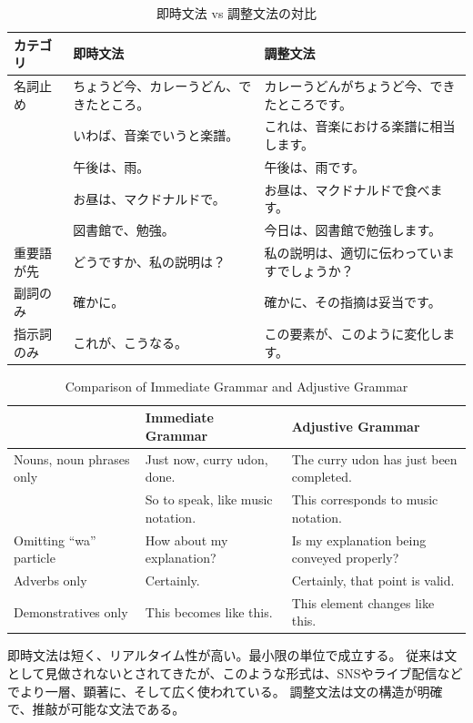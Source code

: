 \documentclass[a4paper]{article}
\begin{document}
\ifJPN
  \begin{table}[htb]\centering\small
  \caption{即時文法 vs 調整文法の対比}
  \label{tab:immediate-vs-adjustive-j}
  \begin{tabular}[c]{@{}lll@{}}
  \toprule
  カテゴリ   & 即時文法  & 調整文法\\ 
  \midrule
  名詞止め   & ちょうど今、カレーうどん、できたところ。&カレーうどんがちょうど今、できたところです。\\
             & いわば、音楽でいうと楽譜。& これは、音楽における楽譜に相当します。\\
             & 午後は、雨。& 午後は、雨です。\\
             & お昼は、マクドナルドで。& お昼は、マクドナルドで食べます。\\
             & 図書館で、勉強。& 今日は、図書館で勉強します。\\
  重要語が先 & どうですか、私の説明は？& 私の説明は、適切に伝わっていますでしょうか？\\
  副詞のみ& 確かに。&確かに、その指摘は妥当です。\\
  指示詞のみ& これが、こうなる。&	この要素が、このように変化します。\\
  \end{tabular}
\end{table}
\else
\begin{table}[htb]\centering\small
  \caption{Comparison of Immediate Grammar and Adjustive Grammar}
  \label{tab:immediate-vs-adjustive}
  \begin{tabular}[c]{@{}lll@{}}
  \toprule
    & Immediate Grammar & Adjustive Grammar \\ 
    \midrule
    Nouns, noun phrases only&
    Just now, curry udon, done.	&The curry udon has just been completed.\\
                                &
    So to speak, like music notation.	&This corresponds to music notation.\\
    Omitting ``wa'' particle&
    How about my explanation?	&Is my explanation being conveyed properly?\\
    Adverbs only&
    Certainly.	&Certainly, that point is valid.\\
    Demonstratives only&
    This becomes like this.	&This element changes like this.\\
  \end{tabular}
\end{table}
\fi

\ifJPN
即時文法は短く、リアルタイム性が高い。最小限の単位で成立する。
従来は文として見做されないとされてきたが、このような形式は、SNSやライブ配信などでより一層、顕著に、そして広く使われている。
調整文法は文の構造が明確で、推敲が可能な文法である。
\end{document}
